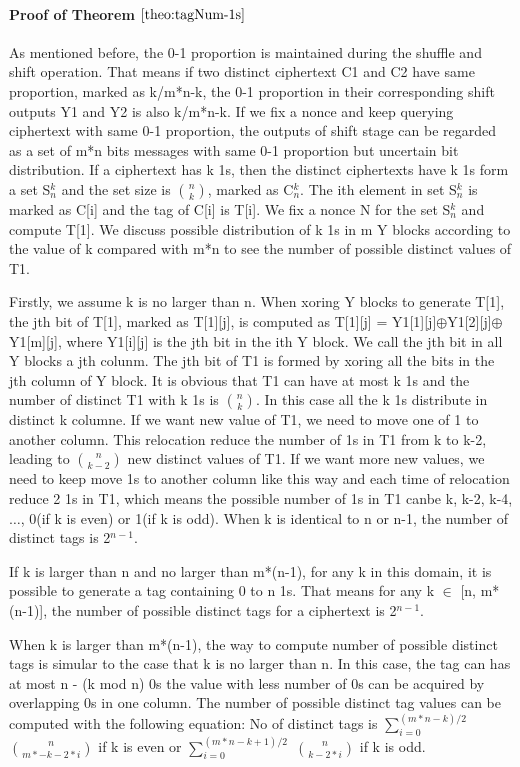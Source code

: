 \documentclass{article}
\begin{document}
\paragraph{Proof of Theorem $\ref{theo:tagNum-1s}$}
As mentioned before, the 0-1 proportion is maintained during the shuffle and shift operation. That means if two distinct ciphertext C1 and C2 have same proportion, marked as k/m*n-k, the 0-1 proportion in their corresponding shift outputs Y1 and Y2 is also k/m*n-k.  
If we fix a nonce and keep querying ciphertext with same 0-1 proportion, the outputs of shift stage can be regarded as a set of m*n bits messages with same 0-1 proportion but uncertain bit distribution. If a ciphertext has k 1s, then the distinct ciphertexts have k 1s form a set S$_{n}^{k}$ and the set size is $\binom{n}{k}$, marked as C$_{n}^{k}$. The ith element in set S$_{n}^{k}$ is marked as C[i] and the tag of C[i] is T[i].   
We fix a nonce N for the set S$_{n}^{k}$ and compute T[1]. We discuss possible distribution of k 1s in m Y blocks according to the value of k compared with m*n to see the number of possible distinct values of T1. 

Firstly, we assume k is no larger than n. When xoring Y blocks to generate T[1], the jth bit of T[1], marked as T[1][j], is computed as T[1][j] = Y1[1][j]$\oplus$Y1[2][j]$\oplus$Y1[m][j], where Y1[i][j] is the jth bit in the ith Y block. We call the jth bit in all Y blocks a jth colunm. The jth bit of T1 is formed by xoring all the bits in the jth column of Y block.  It is obvious that T1 can have at most k 1s and the number of distinct T1 with k 1s is $\binom{n}{k}$. In this case all the k 1s distribute in distinct k columne.  If we want new value of T1, we need to move one of 1 to another column. This relocation reduce the number of 1s in T1 from k to k-2, leading to $\binom{n}{k-2}$ new distinct values of T1. If we want more new values, we need to keep move 1s to another column like this way and each time of relocation reduce 2 1s in T1, which means the possible number of 1s in T1 canbe k, k-2, k-4,$\ldots$, 0(if k is even) or 1(if k is odd). 
When k is identical to n or n-1, the number of distinct tags is 2$^{n-1}$.  

If k is larger than n and no larger than m*(n-1), for any k in this domain, it is possible to generate a tag containing 0 to n 1s. That means for any k $\in$ [n, m*(n-1)], the number of possible distinct tags for a ciphertext is 2$^{n-1}$. 

When k is larger than m*(n-1), the way to compute number of possible distinct tags is simular to the case that k is no larger than n. In this case, the tag can has at most n - (k mod n) 0s the value with less number of 0s can be acquired by overlapping 0s in one column. The number of possible distinct tag values can be computed with the following equation:
No of distinct tags is $\sum_{i=0}^{(m*n-k)/2}$ $\binom{n}{m*-k-2*i}$ if k is even or $\sum_{i=0}^{(m*n-k+1)/2}$ $\binom{n}{k-2*i}$ if k is odd.
\end{document}
